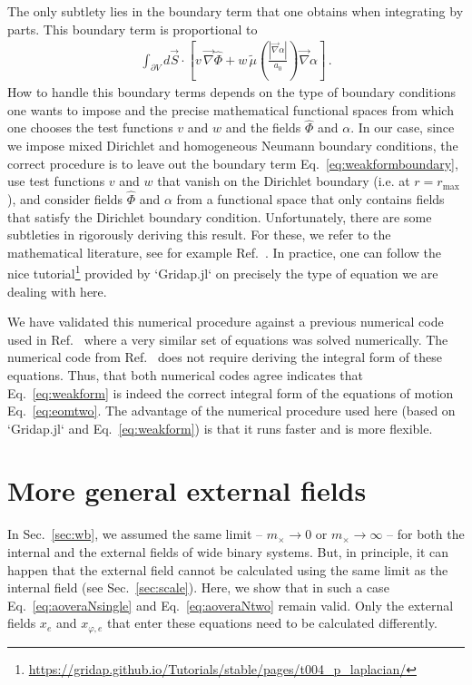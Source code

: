 \documentclass[reprint, amsmath,amssymb, nofootinbib, aps, prd]{revtex4-2}
\begin{document}
The only subtlety lies in the boundary term that one obtains when integrating by parts.
This boundary term is proportional to
\begin{align}
 \label{eq:weakformboundary}
 \int_{\partial V} d\vec{S} \cdot \left[ v \, \vec{\nabla} \hat{\Phi} + w \, \tilde{\mu}\left(\frac{|\vec{\nabla} \alpha|}{a_0}\right) \vec{\nabla} \alpha \right] \,.
\end{align}
How to handle this boundary terms depends on the type of boundary conditions one wants to impose and the precise mathematical functional spaces from which one chooses the test functions $v$ and $w$ and the fields $\hat{\Phi}$ and $\alpha$.
In our case, since we impose mixed Dirichlet and homogeneous Neumann boundary conditions, the correct procedure is to leave out the boundary term Eq.~\eqref{eq:weakformboundary}, use test functions $v$ and $w$ that vanish on the Dirichlet boundary (i.e. at $r = r_{\mathrm{max}}$), and consider fields $\hat{\Phi}$ and $\alpha$ from a functional space that only contains fields that satisfy the Dirichlet boundary condition.
Unfortunately, there are some subtleties in rigorously deriving this result.
For these, we refer to the mathematical literature, see for example Ref.~\cite{Salsa2022}.
In practice, one can follow the nice tutorial\footnote{
  \url{https://gridap.github.io/Tutorials/stable/pages/t004_p_laplacian/}
}
provided by `Gridap.jl` \citep{Badia2020, Verdugo2022} on precisely the type of equation we are dealing with here.

%

We have validated this numerical procedure against a previous numerical code used in Ref.~\cite{Hossenfelder2020} where a very similar set of equations was solved numerically.
The numerical code from Ref.~\cite{Hossenfelder2020} does not require deriving the integral form of these equations.
Thus, that both numerical codes agree indicates that Eq.~\eqref{eq:weakform} is indeed the correct integral form of the equations of motion Eq.~\eqref{eq:eomtwo}.
The advantage of the numerical procedure used here (based on `Gridap.jl` and Eq.~\eqref{eq:weakform}) is that it runs faster and is more flexible.



\section{More general external fields}
\label{sec:appendix:generalefe}

In Sec.~\ref{sec:wb}, we assumed the same limit -- $m_\times \to 0$ or $m_\times \to \infty$ -- for both the internal and the external fields of wide binary systems.
But, in principle, it can happen that the external field cannot be calculated using the same limit as the internal field (see Sec.~\ref{sec:scale}).
Here, we show that in such a case Eq.~\eqref{eq:aoveraNsingle} and Eq.~\eqref{eq:aoveraNtwo} remain valid.
Only the external fields $x_e$ and $x_{\varphi,e}$ that enter these equations need to be calculated differently.
\end{document}
